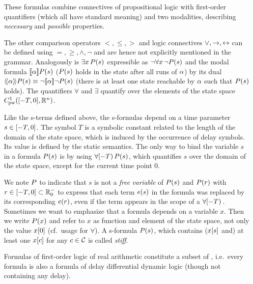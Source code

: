     These formulas combine connectives of propositional logic with first-order quantifiers (which all have standard meaning) and two modalities, describing \emph{necessary} and \emph{possible} properties.

    The other comparison operators $<,\leq,>$ and logic connectives $\lor,\rightarrow,\leftrightarrow$ can be defined using $=,\geq,\land,\lnot$ and are hence not explicitly mentioned in the grammar.
    Analogously is $\exists x{\,} P(s)$ expressible as $\lnot\forall x{\,} \lnot P(s)$ and the modal formula $\dbox{\asprg}{\asfml(s)}$ ($P(s)$ holds in the state after all runs of $\alpha$) by its dual $\ddiamond{\asprg}{\asfml(s)}\equiv\lnot\dbox{\asprg}{\lnot\asfml(s)}$ (there is at least one state reachable by $\alpha$ such that $P(s)$ holds).
    The quantifiers $\forall$ and $\exists$ quantify over the elements of the state space $\statespace$.

    Like the s-terms defined above, the s-formulas depend on a time parameter $s\in[-T,0]$. The symbol $T$ is a symbolic constant related to the length of the domain of the state space, which is induced by the occurrence of delay symbols. Its value is defined by the static semantics.
    The only way to bind the variable $s$ in a formula $P(s)$ is by using $\forall [-T){\,} P(s)$, which quantifies $s$ over the domain of the state space, except for the current time point $0$.

    We note $P$ to indicate that $s$ is not a \emph{free variable} of $P(s)$ and $P(r)$ with $r\in[-T,0]\subset\mathbb{R}^-_0$ to express that each term $e(s)$ in the formula was replaced by its corresponding $e(r)$, even if the term appears in the scope of a $\forall [-T){\,}$.
    Sometimes we want to emphasize that a formula depends on a variable $x$. Then we write $P(x)$ and refer to $x$ as function and element of the state space, not only the value $x[0]$ (cf.\ usage for $\forall$).
    A s-formula $P(s)$, which contains ($x[s]$ and) at least one $x[c]$ for any $c\in\mathcal{C}_{}$ is called \emph{stiff}.
    
    Formulas of first-order logic of real arithmetic constitute a subset of \ddL, i.e.\ every \FOLR formula is also a formula of delay differential dynamic logic (though not containing any delay).

